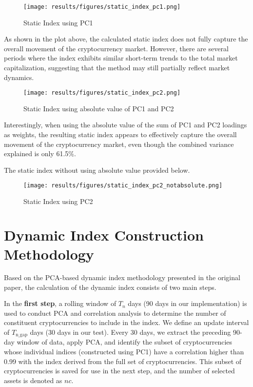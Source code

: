 \documentclass[12pt]{article}
\begin{document}
\begin{figure}[H]
    \centering
    \texttt{[image: results/figures/static\_index\_pc1.png]}
    \caption{Static Index using PC1}
    \label{fig:si1}
\end{figure}

As shown in the plot above, the calculated static index does not fully capture the overall movement of the cryptocurrency market. However, there are several periods where the index exhibits similar short-term trends to the total market capitalization, suggesting that the method may still partially reflect market dynamics.

\begin{figure}[H]
    \centering
    \texttt{[image: results/figures/static\_index\_pc2.png]}
    \caption{Static Index using absolute value of PC1 and PC2}
    \label{fig:si1}
\end{figure}
Interestingly, when using the absolute value of the sum of PC1 and PC2 loadings as weights, the resulting static index appears to effectively capture the overall movement of the cryptocurrency market, even though the combined variance explained is only 61.5\%.

The static index without using absolute value provided below.
\begin{figure}[H]
    \centering
    \texttt{[image: results/figures/static\_index\_pc2\_notabsolute.png]}
    \caption{Static Index using PC2}
    \label{fig:si1}
\end{figure}

\section{Dynamic Index Construction Methodology}

Based on the PCA-based dynamic index methodology presented in the original paper, the calculation of the dynamic index consists of two main steps.

In the \textbf{first step}, a rolling window of \( T_n \) days (90 days in our implementation) is used to conduct PCA and correlation analysis to determine the number of constituent cryptocurrencies to include in the index. We define an update interval of \( T_{\text{n\_gap}} \) days (30 days in our test). Every 30 days, we extract the preceding 90-day window of data, apply PCA, and identify the subset of cryptocurrencies whose individual indices (constructed using PC1) have a correlation higher than 0.99 with the index derived from the full set of cryptocurrencies. This subset of cryptocurrencies is saved for use in the next step, and the number of selected assets is denoted as \( nc \).
\end{document}
